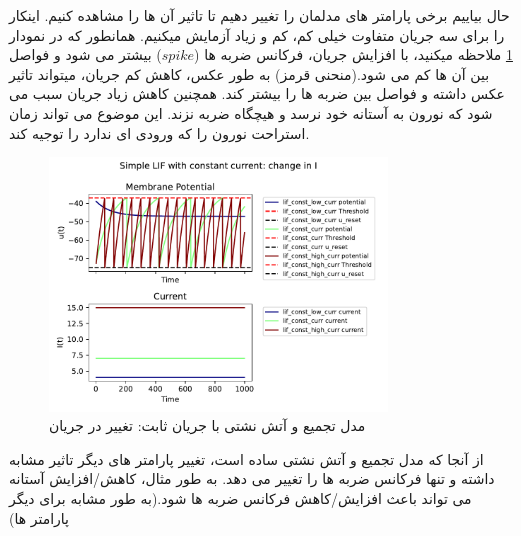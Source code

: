 \documentclass{article}
\begin{document}
            حال بیاییم برخی پارامتر های مدلمان را تغییر دهیم تا تاثیر آن ها را مشاهده کنیم. اینکار را برای سه جریان متفاوت خیلی کم، کم و زیاد آزمایش میکنیم. همانطور که در نمودار 
            \ref{fig:lif-const-change-current-curr} 
            ملاحظه میکنید، با افزایش جریان، فرکانس ضربه ها
            ($spike$)
            بیشتر می شود و فواصل بین آن ها کم می شود.(منحنی قرمز)
            به طور عکس، کاهش کم جریان، میتواند تاثیر عکس داشته و فواصل بین ضربه ها را بیشتر کند.
            همچنین کاهش زیاد جریان سبب می شود که نورون به آستانه خود نرسد و هیچگاه ضربه نزند. این موضوع می تواند زمان استراحت نورون را که ورودی ای ندارد را توجیه کند.

            \begin{figure}[h]
                \centering
                \includegraphics[width=0.8\textwidth]{plots/Simple LIF with constant current: change in I.pdf} 
                \caption{مدل تجمیع و آتش نشتی با جریان ثابت: تغییر در جریان}
                \label{fig:lif-const-change-current-curr}
            \end{figure}

            از آنجا که مدل تجمیع و آتش نشتی ساده است، تغییر پارامتر های دیگر تاثیر مشابه داشته و تنها فرکانس ضربه ها را تغییر می دهد. به طور مثال، کاهش/افزایش آستانه می تواند باعث افزایش/کاهش فرکانس ضربه ها شود.(به طور مشابه برای دیگر پارامتر ها)
\end{document}
